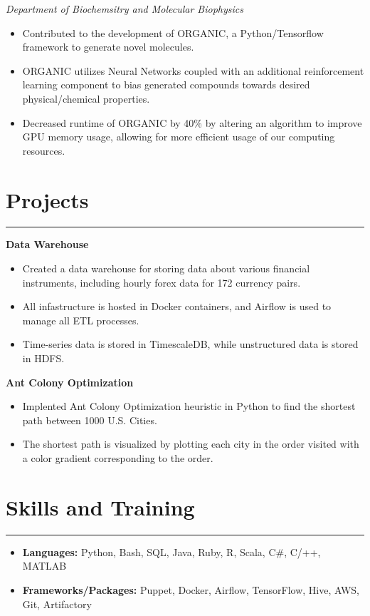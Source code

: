 \documentclass[11pt]{article}
\newcommand{\resumesection}[1]{\vspace{-0.2cm}\section*{#1}\vspace{-0.2cm}\hrule\vspace{0.2cm}}
\begin{document}
\textit{Department of Biochemsitry and Molecular Biophysics}
\begin{itemize}
	\item Contributed to the development of ORGANIC, a Python/Tensorflow framework to generate novel molecules. 
	\item ORGANIC utilizes Neural Networks coupled with an additional reinforcement learning component to bias generated compounds towards desired physical/chemical properties.
	\item Decreased runtime of ORGANIC by 40\% by altering an algorithm to improve GPU memory usage, allowing for more efficient usage of our computing resources.
\end{itemize}

\resumesection{Projects}
\textbf{Data Warehouse}
\begin{itemize}
	\item Created a data warehouse for storing data about various financial instruments, including hourly forex data for 172 currency pairs.
	\item All infastructure is hosted in Docker containers, and Airflow is used to manage all ETL processes.
	\item Time-series data is stored in TimescaleDB, while unstructured data is stored in HDFS.
\end{itemize}

\textbf{Ant Colony Optimization}
\begin{itemize}
	\item Implented Ant Colony Optimization heuristic in Python to find the shortest path between 1000 U.S. Cities.
	\item The shortest path is visualized by plotting each city in the order visited with a color gradient corresponding to the order.
\end{itemize}


\resumesection{Skills and Training}
\begin{itemize}
	\item \textbf{Languages:} Python, Bash, SQL, Java, Ruby, R, Scala, C\#, C/++, MATLAB
	\item \textbf{Frameworks/Packages:} Puppet, Docker, Airflow, TensorFlow, Hive, AWS, Git, Artifactory
\end{itemize}
\end{document}
